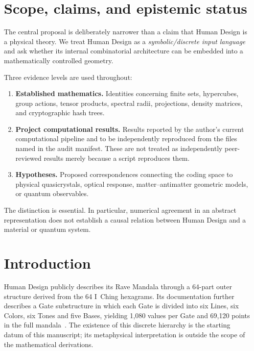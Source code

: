 \documentclass[11pt,a4paper]{article}
\numberwithin{equation}{section}
\begin{document}
\tableofcontents
\newpage

\section{Scope, claims, and epistemic status}
\label{sec:scope}

The central proposal is deliberately narrower than a claim that Human Design is a physical theory. We treat Human Design as a \emph{symbolic/discrete input language} and ask whether its internal combinatorial architecture can be embedded into a mathematically controlled geometry.

Three evidence levels are used throughout:

\begin{enumerate}[label=\textbf{L\arabic*.},leftmargin=2.2em]
  \item \textbf{Established mathematics.} Identities concerning finite sets, hypercubes, group actions, tensor products, spectral radii, projections, density matrices, and cryptographic hash trees.
  \item \textbf{Project computational results.} Results reported by the author's current computational pipeline and to be independently reproduced from the files named in the audit manifest. These are not treated as independently peer-reviewed results merely because a script reproduces them.
  \item \textbf{Hypotheses.} Proposed correspondences connecting the coding space to physical quasicrystals, optical response, matter--antimatter geometric models, or quantum observables.
\end{enumerate}

The distinction is essential. In particular, numerical agreement in an abstract representation does not establish a causal relation between Human Design and a material or quantum system.

\section{Introduction}
\label{sec:introduction}

Human Design publicly describes its Rave Mandala through a 64-part outer structure derived from the 64 I~Ching hexagrams. Its documentation further describes a Gate substructure in which each Gate is divided into six Lines, six Colors, six Tones and five Bases, yielding 1,080 values per Gate and 69,120 points in the full mandala \,\citep{JovianArchiveBasics2026,JovianArchiveDictionary2026}. The existence of this discrete hierarchy is the starting datum of this manuscript; its metaphysical interpretation is outside the scope of the mathematical derivations.
\end{document}
